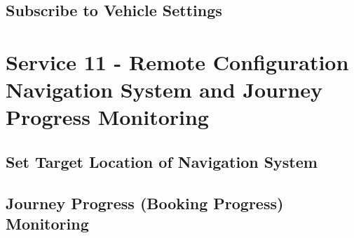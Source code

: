 \subsection*{Subscribe to Vehicle Settings}
\label{subsec:Nachrichten:Dienst10:BookingSettingsSubscription}














\section{Service 11 - Remote Configuration Navigation System and Journey Progress Monitoring}
\label{sec:Nachrichten:Dienst11}

\subsection*{Set Target Location of Navigation System}
\label{subsec:Nachrichten:Dienst11:SetNavigationDestination}





\subsection*{Journey Progress (Booking Progress) Monitoring}
\label{subsec:Nachrichten:Dienst11:BookingProgressSubscription}













